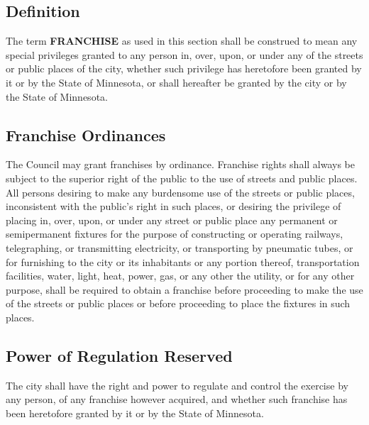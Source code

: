 \subsection{Definition}
The term \textbf{FRANCHISE} as used in this section shall be construed to mean any special privileges granted to any person in, over, upon, or under any of the streets or public places of the city, whether such privilege has heretofore been granted by it or by the State of Minnesota, or shall hereafter be granted by the city or by the State of Minnesota.
\subsection{Franchise Ordinances}
The Council may grant franchises by ordinance. Franchise rights shall always be subject to the superior right of the public to the use of streets and public places. All persons desiring to make any burdensome use of the streets or public places, inconsistent with the public’s right in such places, or desiring the privilege of placing in, over, upon, or under any street or public place any permanent or semipermanent fixtures for the purpose of constructing or operating railways, telegraphing, or transmitting electricity, or transporting by pneumatic tubes, or for furnishing to the city or its inhabitants or any portion thereof, transportation facilities, water, light, heat, power, gas, or any other the utility, or for any other purpose, shall be required to obtain a franchise before proceeding to make the use of the streets or public places or before proceeding to place the fixtures in such places.
\subsection{Power of Regulation Reserved}
The city shall have the right and power to regulate and control the exercise by any person, of any franchise however acquired, and whether such franchise has been heretofore granted by it or by the State of Minnesota.
